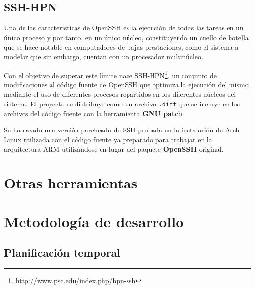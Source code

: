 \subsection{SSH-HPN}

Una de las características de OpenSSH es la ejecución de todas las tareas en un único proceso y por tanto, en un único núcleo, constituyendo un cuello de botella que se hace notable en computadores de bajas prestaciones, como el sistema a modelar que sin embargo, cuentan con un procesador multinúcleo.

Con el objetivo de superar este límite nace SSH-HPN\footnote{\href{http://www.psc.edu/index.php/hpn-ssh}{http://www.psc.edu/index.php/hpn-ssh}}, un conjunto de modificaciones al código fuente de OpenSSH que optimiza la ejecución del mismo mediante el uso de diferentes procesos repartidos en los diferentes núcleos del sistema. El proyecto se distribuye como un archivo \texttt{.diff} que se incluye en los archivos del código fuente con la herramienta \textbf{GNU patch}.

Se ha creado una versión parcheada de SSH probada en la instalación de Arch Linux utilizada con el código fuente ya preparado para trabajar en la arquitectura ARM utilizándose en lugar del paquete \textbf{OpenSSH} original.

\section{Otras herramientas}


\section{Metodología de desarrollo}

\subsection{Planificación temporal}

% 
% 
% 
% 
% 
% 
% 

